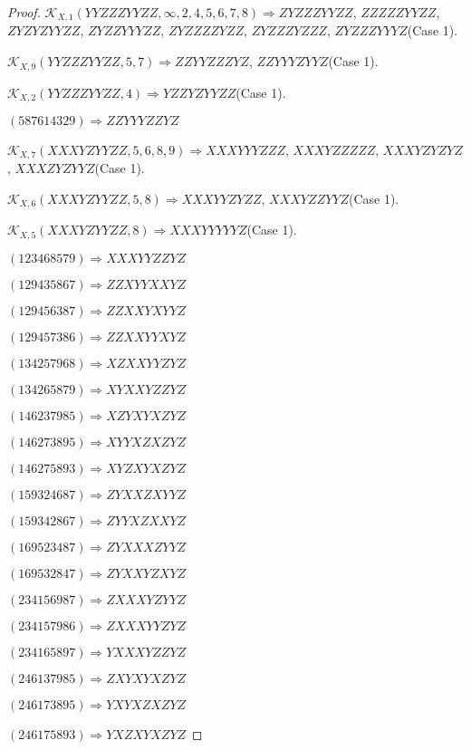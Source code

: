 \documentclass[12pt]{article}
\theoremstyle{plain}
\theoremstyle{definition}
\theoremstyle{remark}
\newcommand{\fancy}[1]{\mathcal{#1}}
\def\K{\fancy{K}}
\begin{document}
\begin{proof}
	$\K_{X,1}(YYZZZYYZZ,\infty,2, 4, 5, 6, 7, 8)\Rightarrow $$ZYZZZYYZZ$, $ZZZZZYYZZ$, $ZYZYZYYZZ$, $ZYZZYYYZZ$, $ZYZZZZYZZ$, $ZYZZZYZZZ$, $ZYZZZYYYZ$(Case 1).
	
	$\K_{X,9}(YYZZZYYZZ,5, 7)\Rightarrow $$ZZYYZZZYZ$, $ZZYYYZYYZ$(Case 1).
	
	$\K_{X,2}(YYZZZYYZZ,4)\Rightarrow $$YZZYZYYZZ$(Case 1).
	
	
	
	$(5 8 7 6 1 4 3 2 9)\Rightarrow ZZYYYZZYZ$
	
	
	
	$\K_{X,7}(XXXYZYYZZ,5, 6, 8, 9)\Rightarrow $$XXXYYYZZZ$, $XXXYZZZZZ$, $XXXYZYZYZ$, $XXXZYZYYZ$(Case 1).
	
	$\K_{X,6}(XXXYZYYZZ,5, 8)\Rightarrow $$XXXYYZYZZ$, $XXXYZZYYZ$(Case 1).
	
	$\K_{X,5}(XXXYZYYZZ,8)\Rightarrow $$XXXYYYYYZ$(Case 1).
	
	
	
	$(1 2 3 4 6 8 5 7 9)\Rightarrow XXXYYZZYZ$
	
	$(1 2 9 4 3 5 8 6 7)\Rightarrow ZZXYYXXYZ$
	
	$(1 2 9 4 5 6 3 8 7)\Rightarrow ZZXXYXYYZ$
	
	$(1 2 9 4 5 7 3 8 6)\Rightarrow ZZXXYYXYZ$
	
	$(1 3 4 2 5 7 9 6 8)\Rightarrow XZXXYYZYZ$
	
	$(1 3 4 2 6 5 8 7 9)\Rightarrow XYXXYZZYZ$
	
	$(1 4 6 2 3 7 9 8 5)\Rightarrow XZYXYXZYZ$
	
	$(1 4 6 2 7 3 8 9 5)\Rightarrow XYYXZXZYZ$
	
	$(1 4 6 2 7 5 8 9 3)\Rightarrow XYZXYXZYZ$
	
	$(1 5 9 3 2 4 6 8 7)\Rightarrow ZYXXZXYYZ$
	
	$(1 5 9 3 4 2 8 6 7)\Rightarrow ZYYXZXXYZ$
	
	$(1 6 9 5 2 3 4 8 7)\Rightarrow ZYXXXZYYZ$
	
	$(1 6 9 5 3 2 8 4 7)\Rightarrow ZYXXYZXYZ$
	
	$(2 3 4 1 5 6 9 8 7)\Rightarrow ZXXXYZYYZ$
	
	$(2 3 4 1 5 7 9 8 6)\Rightarrow ZXXXYYZYZ$
	
	$(2 3 4 1 6 5 8 9 7)\Rightarrow YXXXYZZYZ$
	
	$(2 4 6 1 3 7 9 8 5)\Rightarrow ZXYXYXZYZ$
	
	$(2 4 6 1 7 3 8 9 5)\Rightarrow YXYXZXZYZ$
	
	$(2 4 6 1 7 5 8 9 3)\Rightarrow YXZXYXZYZ$
	

\end{proof}
\end{document}
